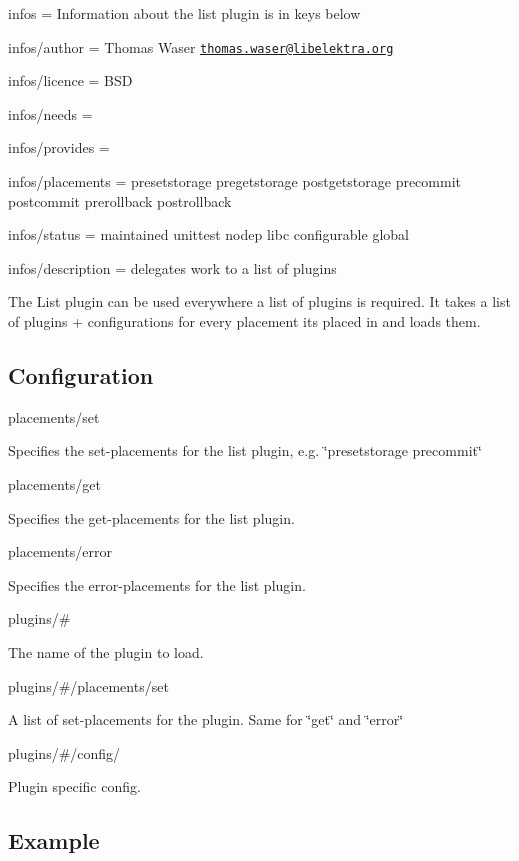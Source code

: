 
\begin{DoxyItemize}
\item infos = Information about the list plugin is in keys below
\item infos/author = Thomas Waser \href{mailto:thomas.waser@libelektra.org}{\tt thomas.\+waser@libelektra.\+org}
\item infos/licence = B\+SD
\item infos/needs =
\item infos/provides =
\item infos/placements = presetstorage pregetstorage postgetstorage precommit postcommit prerollback postrollback
\item infos/status = maintained unittest nodep libc configurable global
\item infos/description = delegates work to a list of plugins
\end{DoxyItemize}

The List plugin can be used everywhere a list of plugins is required. It takes a list of plugins + configurations for every placement it\textquotesingle{}s placed in and loads them.

\subsection*{Configuration}

{\ttfamily placements/set}

Specifies the set-\/placements for the list plugin, e.\+g. \char`\"{}presetstorage precommit\char`\"{}

{\ttfamily placements/get}

Specifies the get-\/placements for the list plugin.

{\ttfamily placements/error}

Specifies the error-\/placements for the list plugin.

{\ttfamily plugins/\#}

The name of the plugin to load.

{\ttfamily plugins/\#/placements/set}

A list of set-\/placements for the plugin. Same for \char`\"{}get\char`\"{} and \char`\"{}error\char`\"{}

{\ttfamily plugins/\#/config/}

Plugin specific config.

\subsection*{Example}

